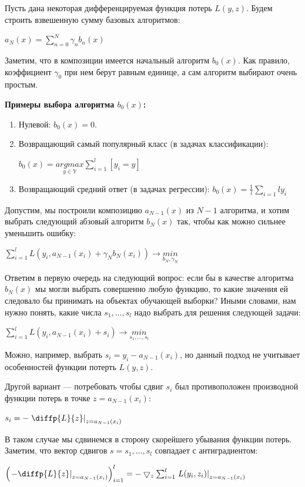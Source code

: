 \documentclass{article}
\theoremstyle{definition}
\theoremstyle{theorem}
\theoremstyle{remark}
\theoremstyle{theorem}
\theoremstyle{example}
\theoremstyle{theorem}
\theoremstyle{theorem}
\theoremstyle{theorem}
\theoremstyle{theorem}
\begin{document}
Пусть дана некоторая дифференцируемая функция потерь $L(y, z)$. Будем строить взвешенную сумму базовых алгоритмов:

$a_N(x) = \sum_{n=0}^{N}\gamma_n b_n(x)$

Заметим, что в композиции имеется начальный алгоритм $b_0(x)$. Как правило, коэффициент $\gamma_0$ при нем берут равным единице, а сам алгоритм выбирают очень простым.

\textbf{Примеры выбора алгоритма $b_0(x)$:}

\begin{enumerate}
	\item Нулевой: $b_0(x) = 0$.
	\item Возвращающий самый популярный класс (в задачах классификации):
	
	$b_0(x) = \underset{y\in\mathbf{\mathbb{Y}}}{argmax}\sum_{i=1}^{l}[y_i=y]$
	\item Возвращающий средний ответ (в задачах регрессии):	
	$b_0(x) = \frac{1}{l}\sum_{i=1}{l}y_i$
\end{enumerate}

Допустим, мы построили композицию $a_{N-1}(x)$ из $N-1$ алгоритма, и хотим выбрать следующий абзовый алгоритм $b_N(x)$ так, чтобы как можно сильнее уменьшить ошибку:

$\sum_{i=1}^{l} L\left(y_i,a_{N-1}(x_i) + \gamma_N b_N(x_i)\right)\rightarrow \underset{b_N,\gamma_N}{min}$

Ответим в первую очередь на следующий вопрос: если бы в качестве алгоритма $b_N (x)$ мы могли выбрать совершенно любую функцию, то какие значения ей следовало бы принимать на объектах обучающей выборки? Иными словами, нам нужно понять, какие числа $s_1,\ldots, s_l$ надо выбрать для решения следующей задачи:

$\sum_{i=1}^{l} L\left(y_i, a_{N-1}(x_i) +s_i\right)\rightarrow \underset{s_1,\ldots, s_l}{min}$

Можно, например, выбрать $s_i = y_i - a_{N-1}(x_i)$, но данный подход не учитывает особенностей функции потерть $L(y,z)$.

Другой вариант --- потребовать чтобы сдвиг $s_i$ был противоположен производной функции потерь в точке $z=a_{N-1}(x_i)$:

$s_i = -\left. \diffp{L}{z} \right|_{z=a_{N-1}(x_i)}$

В таком случае мы сдвинемся в сторону скорейшего убывания функции потерь. Заметим, что вектор сдвигов $s = s_1,\ldots, s_l$ совпадает с антиградиентом:

$\left(\left. -\diffp{L}{z}\right|_{z=a_{N-1}(x_i)}\right)^l_{i=1} = -\bigtriangledown_z \sum_{i=1}^{l}\left. L(y_i,z_i) \right|_{z=a_{N-1}(x_i)}$
\end{document}
